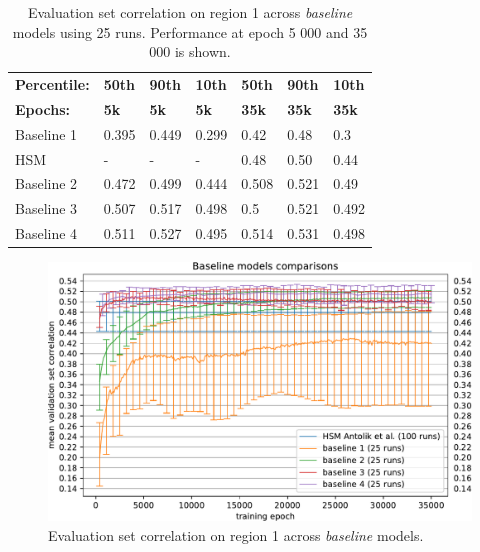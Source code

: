 \setlength{\abovecaptionskip}{10pt plus 0pt minus 0pt} %
\begin{table}[H]
    \renewcommand{\arraystretch}{1.0}
    \centering
    \begin{tabular}{l|l|l|l|l|l|l}
        \toprule
        \textbf{Percentile:} & \textbf{50th} & \textbf{90th} & \textbf{10th} & \textbf{50th} & \textbf{90th} & \textbf{10th} \\
        \textbf{Epochs:} & \textbf{5k} & \textbf{5k} & \textbf{5k} & \textbf{35k} & \textbf{35k}& \textbf{35k} \\ \midrule
        Baseline 1 & 0.395 & 0.449 & 0.299 & 0.42 & 0.48 & 0.3 \\ 
        HSM \citeauthor{antolik} & - & - & - & 0.48 & 0.50 & 0.44 \\ 
        Baseline 2 & 0.472 & 0.499 & 0.444 & 0.508 & 0.521 & 0.49 \\ 
        Baseline 3 & 0.507 & 0.517 & 0.498 & 0.5 & 0.521 & 0.492 \\ 
        Baseline 4 & 0.511 & 0.527 & 0.495 & 0.514 & 0.531 & 0.498 \\ \bottomrule
    \end{tabular}
    \caption[Evaluation of 5k/35k epochs training on region 1]{Evaluation set correlation on region 1 across \textit{baseline} models using 25 runs. Performance at epoch 5 000 and 35 000 is shown\protect\footnotemark. }
    \label{tab:5.1.5}
    \renewcommand{\arraystretch}{1.0}
\end{table}
\setlength{\abovecaptionskip}{0pt plus 0pt minus 0pt} %

\begin{figure}[H]
    \centering
    \includegraphics[width=1\textwidth]{../figures/05_1_5_1}
    \caption[Baseline models on region 1]{Evaluation set correlation on region 1 across \textit{baseline} models\protect\footnotemark.}
    \label{fig:5.1.5}
\end{figure}

